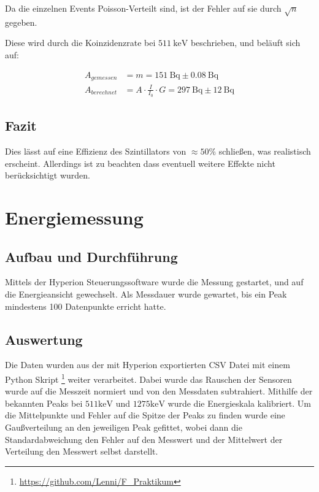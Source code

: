 \documentclass[12pt,twoside,a4paper]{scrartcl}
\begin{document}
			Da die einzelnen Events Poisson-Verteilt sind, ist der Fehler auf sie durch $\sqrt{n}$ gegeben.

			Diese wird durch die Koinzidenzrate bei $\SI{511}{\kilo \electronvolt}$ beschrieben, und beläuft sich auf:

			\begin{align*}
				A_{gemessen} &= m = \SI{151}{\becquerel} \pm \SI{0.08}{\becquerel} \\
				A_{berechnet} &= A \cdot \frac{I}{I_0} \cdot G = \SI{297}{\becquerel} \pm \SI{12}{\becquerel}
			\end{align*}

		\subsection{Fazit}

			Dies lässt auf eine Effizienz des Szintillators von $ \approx 50 \%$ schließen, was realistisch erscheint. Allerdings ist zu beachten dass eventuell weitere Effekte nicht berücksichtigt wurden.

	\section{Energiemessung}

	\subsection{Aufbau und Durchführung}
		Mittels der Hyperion Steuerungssoftware wurde die Messung gestartet, und auf die Energieansicht gewechselt. Als Messdauer wurde gewartet, bis ein Peak mindestens 100 Datenpunkte erricht hatte.


	\subsection{Auswertung}

		Die Daten wurden aus der mit Hyperion exportierten CSV Datei mit einem Python Skript \footnote{\url{https://github.com/Lenni/F_Praktikum}} weiter verarbeitet. Dabei wurde das Rauschen der Sensoren wurde auf die Messzeit normiert und von den Messdaten subtrahiert. Mithilfe der bekannten Peaks bei $511 \si{\kilo \electronvolt}$ und $1275 \si{\kilo \electronvolt}$ wurde die Energieskala kalibriert. Um die Mittelpunkte und Fehler auf die Spitze der Peaks zu finden wurde eine Gaußverteilung an den jeweiligen Peak gefittet, wobei dann die Standardabweichung den Fehler auf den Messwert und der Mittelwert der Verteilung den Messwert selbst darstellt.
\end{document}
